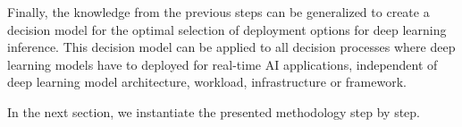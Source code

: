 Finally, the knowledge from the previous steps can be generalized to create a decision model for the optimal selection of deployment options for deep learning inference.
This decision model can be applied to all decision processes where deep learning models have to deployed for real-time AI applications, independent of deep learning model architecture, workload, infrastructure or framework.



\vspace{0.5cm}
In the next section, we instantiate the presented methodology step by step.










\endinput 